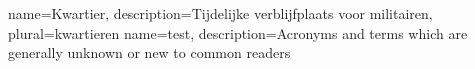 {
    name=Kwartier,
    description={Tijdelijke verblijfplaats voor militairen},
    plural=kwartieren
}
{
    name=test,
    description={Acronyms and terms which are generally unknown or new to common readers}
}